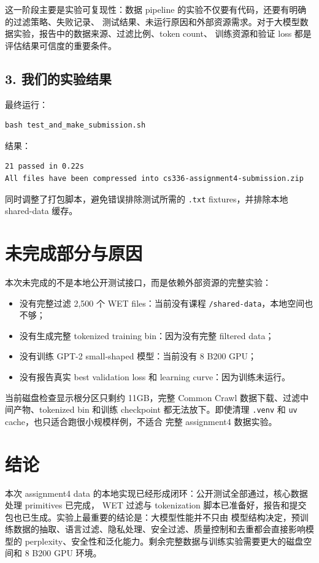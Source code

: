 \documentclass[UTF8,11pt]{ctexart}
\begin{document}
这一阶段主要是实验可复现性：数据 pipeline 的实验不仅要有代码，还要有明确的过滤策略、失败记录、
测试结果、未运行原因和外部资源需求。对于大模型数据实验，报告中的数据来源、过滤比例、token count、
训练资源和验证 loss 都是评估结果可信度的重要条件。

\subsection*{3. 我们的实验结果}

最终运行：

\begin{lstlisting}
bash test_and_make_submission.sh
\end{lstlisting}

结果：

\begin{lstlisting}
21 passed in 0.22s
All files have been compressed into cs336-assignment4-submission.zip
\end{lstlisting}

同时调整了打包脚本，避免错误排除测试所需的 \texttt{.txt} fixtures，并排除本地 shared-data 缓存。

\section{未完成部分与原因}

本次未完成的不是本地公开测试接口，而是依赖外部资源的完整实验：

\begin{itemize}
  \item 没有完整过滤 2,500 个 WET files：当前没有课程 \texttt{/shared-data}，本地空间也不够；
  \item 没有生成完整 tokenized training bin：因为没有完整 filtered data；
  \item 没有训练 GPT-2 small-shaped 模型：当前没有 8 B200 GPU；
  \item 没有报告真实 best validation loss 和 learning curve：因为训练未运行。
\end{itemize}

当前磁盘检查显示根分区只剩约 11GB，完整 Common Crawl 数据下载、过滤中间产物、tokenized bin 和训练
checkpoint 都无法放下。即使清理 \texttt{.venv} 和 \texttt{uv} cache，也只适合跑很小规模样例，不适合
完整 assignment4 数据实验。

\section{结论}

本次 assignment4 data 的本地实现已经形成闭环：公开测试全部通过，核心数据处理 primitives 已完成，
WET 过滤与 tokenization 脚本已准备好，报告和提交包也已生成。实验上最重要的结论是：大模型性能并不只由
模型结构决定，预训练数据的抽取、语言过滤、隐私处理、安全过滤、质量控制和去重都会直接影响模型的
perplexity、安全性和泛化能力。剩余完整数据与训练实验需要更大的磁盘空间和 8 B200 GPU 环境。
\end{document}
